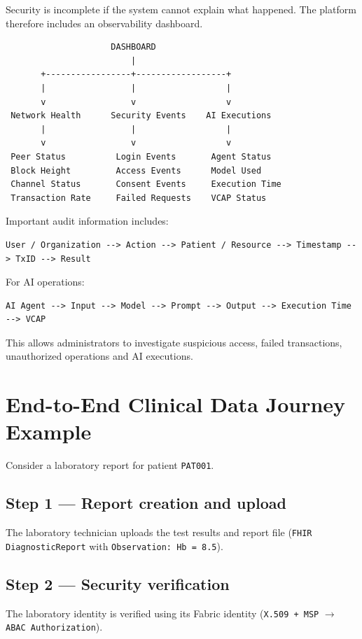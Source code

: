 \documentclass[11pt,a4paper]{article}
\begin{document}
Security is incomplete if the system cannot explain what happened. The platform therefore includes an observability dashboard.

\begin{lstlisting}
                     DASHBOARD
                         |
       +-----------------+------------------+
       |                 |                  |
       v                 v                  v
 Network Health      Security Events    AI Executions
       |                 |                  |
       v                 v                  v
 Peer Status          Login Events       Agent Status
 Block Height         Access Events      Model Used
 Channel Status       Consent Events     Execution Time
 Transaction Rate     Failed Requests    VCAP Status
\end{lstlisting}

Important audit information includes:
\begin{lstlisting}
User / Organization --> Action --> Patient / Resource --> Timestamp --> TxID --> Result
\end{lstlisting}

For AI operations:
\begin{lstlisting}
AI Agent --> Input --> Model --> Prompt --> Output --> Execution Time --> VCAP
\end{lstlisting}

This allows administrators to investigate suspicious access, failed transactions, unauthorized operations and AI executions.

\newpage
\section{End-to-End Clinical Data Journey Example}

Consider a laboratory report for patient \texttt{PAT001}.

\subsection*{Step 1 --- Report creation and upload}
The laboratory technician uploads the test results and report file (\texttt{FHIR DiagnosticReport} with \texttt{Observation: Hb = 8.5}).

\subsection*{Step 2 --- Security verification}
The laboratory identity is verified using its Fabric identity (\texttt{X.509 + MSP} $\rightarrow$ \texttt{ABAC Authorization}).
\end{document}
